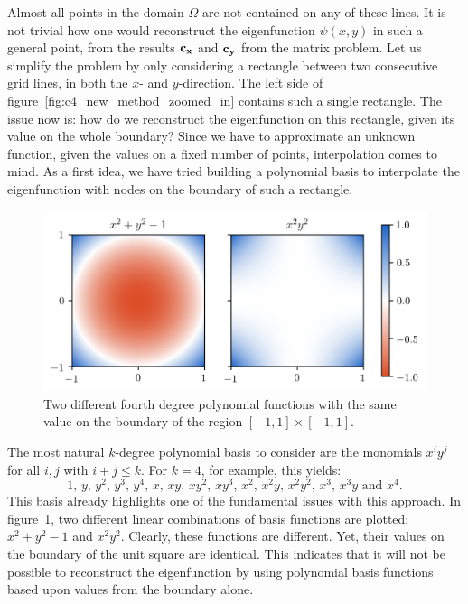 Almost all points in the domain $\Omega$ are not contained on any of these lines. It is not trivial how one would reconstruct the eigenfunction $\psi(x, y)$ in such a general point, from the results $\vb{c_x}$ and $\vb{c_y}$ from the matrix problem. Let us simplify the problem by only considering a rectangle between two consecutive grid lines, in both the $x$- and $y$-direction. The left side of figure~\ref{fig:c4_new_method_zoomed_in} contains such a single rectangle. The issue now is: how do we reconstruct the eigenfunction on this rectangle, given its value on the whole boundary? Since we have to approximate an unknown function, given the values on a fixed number of points, interpolation comes to mind. As a first idea, we have tried building a polynomial basis to interpolate the eigenfunction with nodes on the boundary of such a rectangle.

\begin{figure}
    \begin{center}
        \includegraphics[width=1\textwidth]{img/chapter4/nm_interpolation.png}
    \end{center}
    \caption{Two different fourth degree polynomial functions with the same value on the boundary of the region $[-1, 1] \times [-1, 1]$.}\label{fig:c4_interpolation_boundary issue}
\end{figure}

The most natural $k$-degree polynomial basis to consider are the monomials $x^i y^j$ for all $i, j$ with $i + j \leq k$. For $k = 4$, for example, this yields:
$$
    1\text{, } y\text{, } y^2\text{, } y^3\text{, } y^4\text{, } x\text{, } x y\text{, } x y^2\text{, } x y^3\text{, } x^2\text{, } x^2 y\text{, } x^2 y^2\text{, } x^3\text{, } x^3 y\text{ and } x^4\text{.}
$$
This basis already highlights one of the fundamental issues with this approach. In figure~\ref{fig:c4_interpolation_boundary issue}, two different linear combinations of basis functions are plotted: $x^2 + y^2 -1$ and $x^2y^2$. Clearly, these functions are different. Yet, their values on the boundary of the unit square are identical. This indicates that it will not be possible to reconstruct the eigenfunction by using polynomial basis functions based upon values from the boundary alone.

